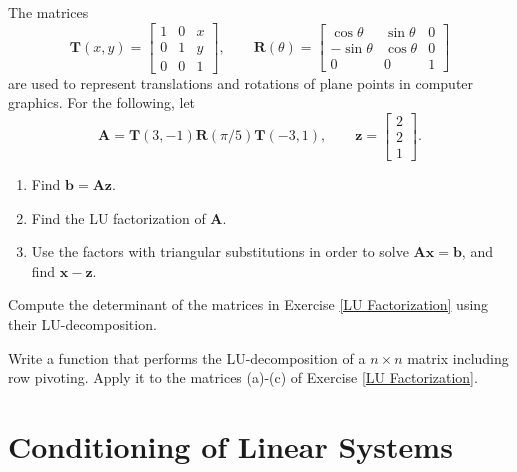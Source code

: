 \begin{exercise}
    The matrices
    $$
    \mathbf{T}(x,y) = \begin{bmatrix}
        1 & 0 & x \\ 
        0 & 1 & y \\ 
        0 & 0 & 1
    \end{bmatrix},\qquad
    \mathbf{R}(\theta) = \begin{bmatrix}
        \cos\theta & \sin \theta & 0 \\ 
        -\sin\theta & \cos \theta & 0 
        \\ 0 & 0 & 1
    \end{bmatrix}
    $$
    are used to represent translations and rotations of plane points in computer graphics. For the following, let
    $$
        \mathbf{A} = \mathbf{T}(3,-1)\mathbf{R}(\pi/5)\mathbf{T}(-3,1), 
        \qquad
        \mathbf{z} = 
        \begin{bmatrix}
            2 \\ 2 \\ 1
        \end{bmatrix}.
    $$
    \begin{enumerate}
        \item Find $\mathbf{b} = \mathbf{A}\mathbf{z}$.
        \item Find the LU factorization of $\mathbf{A}$.
        \item Use the factors with triangular substitutions in order to solve $\mathbf{A}\mathbf{x}=\mathbf{b}$, and find $\mathbf{x}-\mathbf{z}$.
    \end{enumerate}
\end{exercise}

\begin{exercise}
    Compute the determinant of the matrices in Exercise \ref{LU Factorization} using their LU-decomposition.
\end{exercise}

\begin{exercise}
    Write a function that performs the LU-decomposition of a $n\times n$ matrix including row pivoting. Apply it to the matrices (a)-(c) of Exercise \ref{LU Factorization}.
\end{exercise}

\section{Conditioning of Linear Systems}

